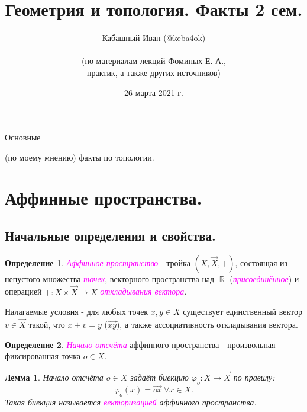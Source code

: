 \documentclass[a4paper,100pt]{article}
\title{Геометрия и топология. Факты 2 сем.}
\author{Кабашный Иван (@keba4ok)\\ \\ (по материалам лекций Фоминых Е. А.,\\ практик, а также других источников)}
\date{26 марта 2021 г.}
\theoremstyle{indented}
\newtheorem{lemma}{Лемма}
\theoremstyle{definition}
\newtheorem{defn}{Определение}
\theoremstyle{remark}
\DeclareMathOperator{\ra}{\rightarrow}
\DeclareMathOperator{\RR}{\mathbb{R}}
\begin{document}
\newcommand{\resetexlcounters}{%
  \setcounter{exl}{0}%
} 

\newcommand{\resetremarkcounters}{%
  \setcounter{remark}{0}%
} 

\newcommand{\reseconscounters}{%
  \setcounter{cons}{0}%
} 

\newcommand{\resetall}{%
    \resetexlcounters
    \resetremarkcounters
    \reseconscounters%
}

\maketitle 

\newpage

\hypertarget{t1}{Основные} (по моему мнению) факты по топологии.
\tableofcontents

\newpage


\section{Аффинные пространства.}

\subsection{Начальные определения и свойства.}

\begin{defn}
    \textit{\textcolor{magenta}{\hypertarget{s1}{Аффинное пространство}}} - тройка $(X, \vec{X}, +)$, состоящая из непустого множества \textit{\textcolor{magenta}{\hypertarget{s2}{точек}}}, векторного пространства над $\RR$ (\textit{\textcolor{magenta}{\hypertarget{s3}{присоединённое}}}) и операцией $+:X\times \vec{X}\ra X$ \textit{\textcolor{magenta}{\hypertarget{s4}{откладывания вектора}}}. \ 

    Налагаемые условия - для любых точек $x, y\in X$ существует единственный вектор $v\in \vec{X}$ такой, что $x+v=y$ ($\vec{xy}$), а также ассоциативность откладывания вектора.
\end{defn}

\begin{defn}
    \textit{\textcolor{magenta}{\hypertarget{s5}{Начало отсчёта}}} аффинного пространства - произвольная фиксированная точка $o\in X$. 
\end{defn}

\begin{lemma}
    Начало отсчёта $o\in X$ задаёт биекцию $\varphi_o: X\ra \vec{X}$ по правилу:
    \[
        \varphi_o(x)=\vec{ox} \: \forall x \in X. 
    \]
    Такая биекция называется \textit{\textcolor{magenta}{\hypertarget{s6}{векторизацией}}} аффинного пространства.
\end{lemma}
\end{document}
